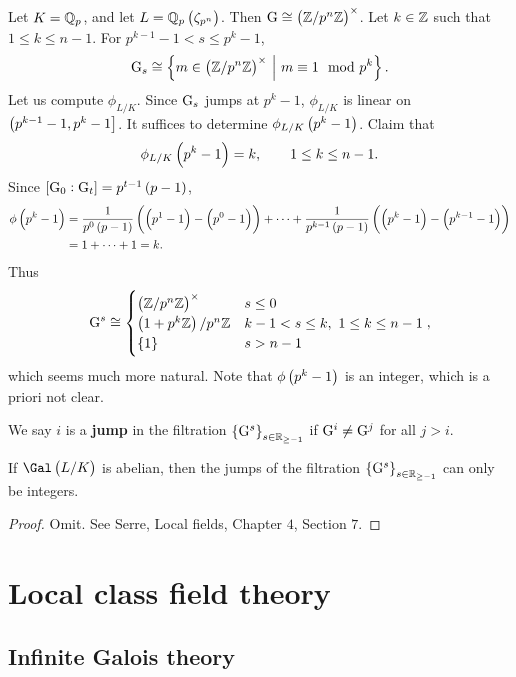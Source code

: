 \begin{example*}
Let $ K = \mathbb{Q}_p $, and let $ L = \QQ_p\br{\zeta_{p^n}} $. Then $ \G \cong \br{\ZZ / p^n\ZZ}^\times $. Let $ k \in \mathbb{Z} $ such that $ 1 \le k \le n - 1 $. For $ p^{k - 1} - 1 < s \le p^k - 1 $,
$$ \G_s \cong \cbr{m \in \br{\ZZ / p^n\ZZ}^\times \st m \equiv 1 \mod p^k}. $$
Let us compute $ \phi_{L / K} $. Since $ \mathrm{G}_s $ jumps at $ p^k - 1 $, $ \phi_{L / K} $ is linear on $ \intoc{p^{k - 1} - 1, p^k - 1} $. It suffices to determine $ \phi_{L / K}\br{p^k - 1} $. Claim that
$$ \phi_{L / K}\br{p^k - 1} = k, \qquad 1 \le k \le n - 1. $$
Since $ \sbr{\G_0 : \G_t} = p^{t - 1}\br{p - 1} $,
\begin{align*}
\phi\br{p^k - 1}
& = \dfrac{1}{p^0\br{p - 1}}\br{\br{p^1 - 1} - \br{p^0 - 1}} + \dots + \dfrac{1}{p^{k - 1}\br{p - 1}}\br{\br{p^k - 1} - \br{p^{k - 1} - 1}} \\
& = 1 + \dots + 1
= k.
\end{align*}
Thus
$$ \G^s \cong
\begin{cases}
\br{\ZZ / p^n\ZZ}^\times & s \le 0 \\
\br{1 + p^k\ZZ} / p^n\ZZ & k - 1 < s \le k, \ 1 \le k \le n - 1 \\
\cbr{1} & s > n - 1
\end{cases},
$$
which seems much more natural. Note that $ \phi\br{p^k - 1} $ is an integer, which is a priori not clear.
\end{example*}

\begin{definition}
We say $ i $ is a \textbf{jump} in the filtration $ \cbr{\G^s}_{s \in \RR_{\ge -1}} $ if $ \mathrm{G}^i \ne \mathrm{G}^j $ for all $ j > i $.
\end{definition}

\begin{theorem}
If $ \Gal\br{L / K} $ is abelian, then the jumps of the filtration $ \cbr{\G^s}_{s \in \RR_{\ge -1}} $ can only be integers.
\end{theorem}

\begin{proof}
Omit. See Serre, Local fields, Chapter $ 4 $, Section $ 7 $.
\end{proof}

\pagebreak

\section{Local class field theory}

\subsection{Infinite Galois theory}

